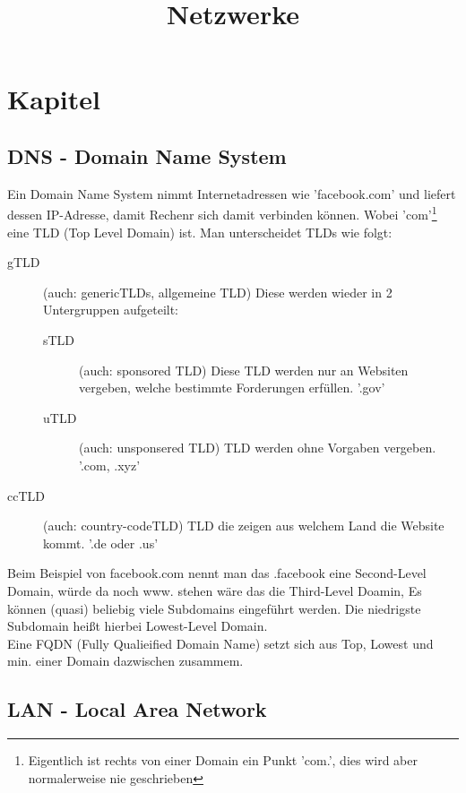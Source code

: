 \documentclass[a4paper,10pt]{scrartcl}
\title{Netzwerke}
\author{}
\date{}
\begin{document}
\maketitle
\newpage
\tableofcontents
\newpage
\section{Kapitel}
    \subsection{DNS - Domain Name System}
        Ein Domain Name System nimmt Internetadressen wie 'facebook.com' und liefert dessen IP-Adresse, 
        damit Rechenr sich damit verbinden können. Wobei 'com'\footnote[1]{Eigentlich ist rechts von einer Domain ein Punkt 'com.', dies wird aber normalerweise nie geschrieben} eine TLD (Top Level Domain) ist. Man unterscheidet TLDs wie folgt:
        \begin{description}
            \item [gTLD] (auch: genericTLDs, allgemeine TLD) Diese werden wieder in 2 Untergruppen aufgeteilt:
                \begin{description}
                    \item [sTLD] (auch: sponsored TLD) Diese TLD werden nur an Websiten vergeben, welche bestimmte Forderungen erfüllen. '.gov'
                    \item [uTLD] (auch: unsponsered TLD) TLD werden ohne Vorgaben vergeben. '.com, .xyz' 
                \end{description} 
            \item [ccTLD] (auch: country-codeTLD) TLD die zeigen aus welchem Land die Website kommt. '.de oder .us'
        \end{description}
        Beim Beispiel von facebook.com nennt man das .facebook eine Second-Level Domain, würde da noch www. stehen wäre das die Third-Level Doamin,
        Es können (quasi) beliebig viele Subdomains eingeführt werden. Die niedrigste Subdomain heißt hierbei Lowest-Level Domain. \\
        Eine FQDN (Fully Qualieified Domain Name) setzt sich aus Top, Lowest und min. einer Domain dazwischen zusammem.
    \subsection{LAN - Local Area Network}
\end{document}
